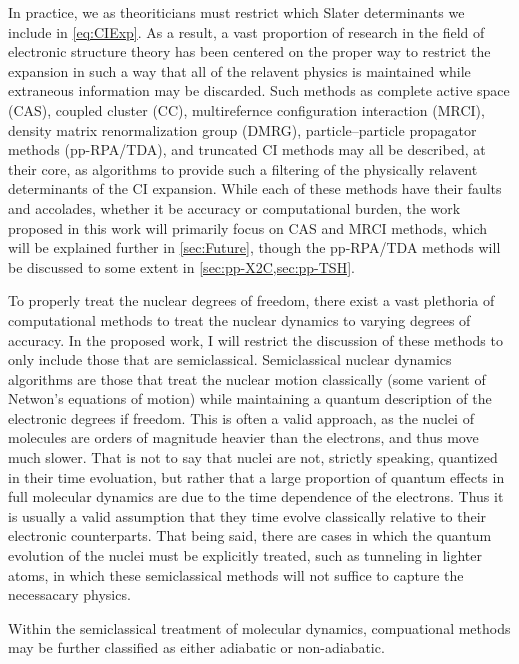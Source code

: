 \documentclass[12pt]{article}
\begin{document}
In practice, we as theoriticians must restrict which Slater determinants we
include in \cref{eq:CIExp}. As a result, a vast proportion of research in the
field of electronic structure theory has been centered on the proper way to
restrict the expansion in such a way that all of the relavent physics is
maintained while extraneous information may be discarded. Such methods as
complete active space (CAS), coupled cluster (CC), multirefernce configuration
interaction (MRCI), density matrix renormalization group (DMRG),
particle--particle propagator methods (pp-RPA/TDA), and truncated CI methods may
all be described, at their core, as algorithms to provide such a filtering of
the physically relavent determinants of the CI expansion. While each of these
methods have their faults and accolades, whether it be accuracy or computational
burden, the work proposed in this work will primarily focus on CAS and MRCI
methods, which will be explained further in \cref{sec:Future}, though the
pp-RPA/TDA methods will be discussed to some extent in 
\cref{sec:pp-X2C,sec:pp-TSH}.

To properly treat the nuclear degrees of freedom, there exist a vast plethoria
of computational methods to treat the nuclear dynamics to varying degrees of
accuracy. In the proposed work, I will restrict the discussion of these methods
to only include those that are semiclassical. Semiclassical nuclear dynamics
algorithms are those that treat the nuclear motion classically (some varient of
Netwon's equations of motion) while maintaining a quantum description of the
electronic degrees if freedom. This is often a valid approach, as the nuclei of
molecules are orders of magnitude heavier than the electrons, and thus move much
slower. That is not to say that nuclei are not, strictly speaking, quantized in
their time evoluation, but rather that a large proportion of quantum effects in
full molecular dynamics are due to the time dependence of the electrons. Thus it
is usually a valid assumption that they time evolve classically relative to
their electronic counterparts. That being said, there are cases in which the
quantum evolution of the nuclei must be explicitly treated, such as tunneling in
lighter atoms, in which these semiclassical methods will not suffice to capture
the necessacary physics.

Within the semiclassical treatment of molecular dynamics, compuational methods
may be further classified as either adiabatic or non-adiabatic. 
\end{document}
